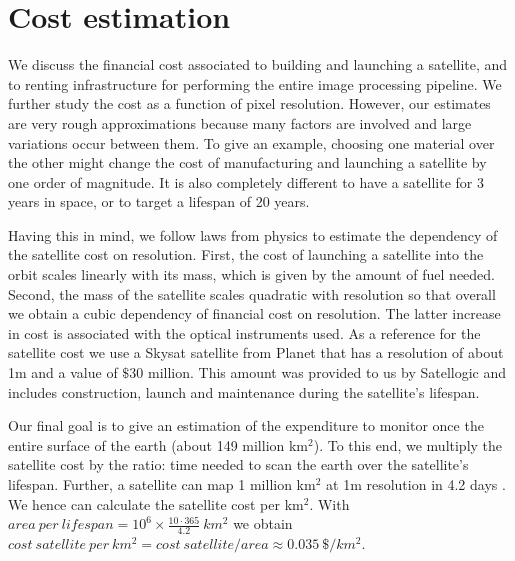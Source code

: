 \section{Cost estimation}

We discuss the financial cost associated to building and launching a satellite, and to renting infrastructure for performing the entire image processing pipeline. We further study the cost as a function of pixel resolution. However, our estimates are very rough approximations because many factors are involved and large variations occur between them. To give an example, choosing one material over the other might change the cost of manufacturing and launching a satellite by one order of magnitude. It is also completely different to have a satellite for 3 years in space, or to target a lifespan of 20 years. 

Having this in mind, we follow laws from physics to estimate the dependency of the satellite cost on resolution. First, the cost of launching a satellite into the orbit scales linearly with its mass, which is given by the amount of fuel needed. Second, the mass of the satellite scales quadratic with resolution so that overall we obtain a cubic dependency of financial cost on resolution. The latter increase in cost is associated with the optical instruments used. As a reference for the satellite cost we use a Skysat satellite from Planet \parencite{skysat_planet} that has a resolution of about 1m and a value of $\$30$ million. This amount was provided to us by Satellogic and includes construction, launch and maintenance during the satellite's lifespan.

Our final goal is to give an estimation of the expenditure to monitor once the entire surface of the earth (about 149 million km$^2$). To this end, we multiply the satellite cost by the ratio: time needed to scan the earth over the satellite's lifespan. Further, a satellite can map 1 million km$^2$ at 1m resolution in 4.2 days \parencite{satellogic_youtube}. We hence can calculate the satellite cost per km$^2$. With $area~per~lifespan = 10^6 \times \frac{10\cdot365}{4.2}~km^2$ we obtain $cost~satellite~per~km^2 = cost~satellite/area \approx 0.035~\$/km^2$.

